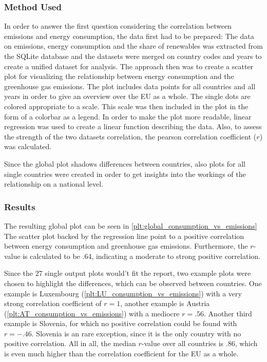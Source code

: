 \documentclass{article}
\begin{document}
\subsubsection*{Method Used}
In order to answer the first question considering the correlation between emissions and energy consumption, the data first had to be prepared:
The data on emissions, energy consumption and the share of renewables was extracted from the SQLite database and the datasets were merged on
country codes and years to create a unified dataset for analysis.
The approach then was to create a scatter plot for visualizing the relationship between energy consumption and the
greenhouse gas emissions. The plot includes data points for all countries and all years in order to give an overview
over the EU as a whole. The single dots are colored appropriate to a scale.
This scale was then included in the plot in the form of a colorbar as a legend.
In order to make the plot more readable, linear regression was used to create a linear function describing the data.
Also, to assess the strength of the two datasets correlation, the pearson correlation coefficient ($r$) was calculated.

Since the global plot shadows differences between countries, also plots for all single countries were created in order to get
insights into the workings of the relationship on a national level.

\subsubsection*{Results}
The resulting global plot can be seen in \cref{plt:global_consumption_vs_emissions}
The scatter plot backed by the regression line point to a positive correlation between energy consumption and greenhouse gas emissions.
Furthermore, the $r$-value is calculated to be .64, indicating a moderate to strong positive correlation.

Since the 27 single output plots would't fit the report, two example plots were chosen to highlight the differences, which can be observed between countries.
One example is Luxembourg (\cref{plt:LU_consumption_vs_emissions}) with a very strong correlation coefficient of $r=1$, another example is Austria
(\cref{plt:AT_consumption_vs_emissions}) with a mediocre $r=.56$. Another third example is
Slovenia, for which no positive correlation could be found with $r=-.46$.
Slovenia is an rare exception, since it is the only country with no positive correlation.
All in all, the median $r$-value over all countries is .86, which is even much higher than the correlation coefficient for the EU as a whole.
\end{document}
